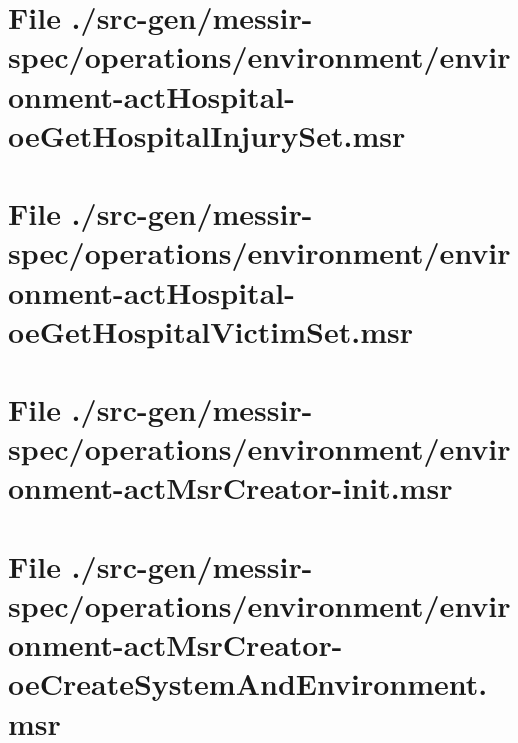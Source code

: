 \section[File /src-gen/messir-spec.../environment-actHospital-oeGetHospitalInjurySet.msr]{File ./src-gen/messir-spec/operations/environment/environment-actHospital-oeGetHospitalInjurySet.msr}
\scriptsize

\normalsize
	
\section[File /src-gen/messir-spec.../environment-actHospital-oeGetHospitalVictimSet.msr]{File ./src-gen/messir-spec/operations/environment/environment-actHospital-oeGetHospitalVictimSet.msr}
\scriptsize

\normalsize
	
\section[File /src-gen/messir-spec/operations.../environment-actMsrCreator-init.msr]{File ./src-gen/messir-spec/operations/environment/environment-actMsrCreator-init.msr}
\scriptsize

\normalsize
	
\section[File /src-gen.../environment-actMsrCreator-oeCreateSystemAndEnvironment.msr]{File ./src-gen/messir-spec/operations/environment/environment-actMsrCreator-oeCreateSystemAndEnvironment.msr}
\scriptsize

\normalsize
	
